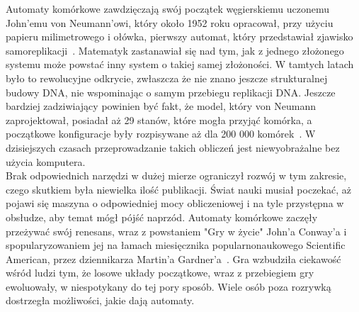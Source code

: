 \documentclass[a4paper,12pt]{article}
\begin{document}
Automaty komórkowe zawdzięczają swój początek węgierskiemu uczonemu John'emu von Neumann'owi, który około 1952 roku opracował, przy użyciu papieru milimetrowego i ołówka, pierwszy automat, który przedstawiał zjawisko samoreplikacji~\cite[s. 155]{hill}. Matematyk zastanawiał się nad tym, jak z jednego złożonego systemu może powstać inny system o takiej samej złożoności. W tamtych latach było to rewolucyjne odkrycie, zwłaszcza że nie znano jeszcze strukturalnej budowy DNA, nie wspominając o samym przebiegu replikacji DNA. Jeszcze bardziej zadziwiający powinien być fakt, że model, który von Neumann zaprojektował, posiadał aż 29 stanów, które mogła przyjąć komórka, a początkowe konfiguracje były rozpisywane aż dla 200 000 komórek~\cite[s. 155, 156]{hill}. W dzisiejszych czasach przeprowadzanie takich obliczeń jest niewyobrażalne bez użycia komputera.\\
Brak odpowiednich narzędzi w dużej mierze ograniczył rozwój w tym zakresie, czego skutkiem była niewielka ilość publikacji. Świat nauki musiał poczekać, aż pojawi się maszyna o odpowiedniej mocy obliczeniowej i na tyle przystępna w obsłudze, aby temat mógł pójść naprzód. Automaty komórkowe zaczęły przeżywać swój renesans, wraz z powstaniem "Gry w życie" John'a Conway'a i spopularyzowaniem jej na łamach miesięcznika popularnonaukowego Scientific American, przez dziennikarza Martin'a Gardner'a~\cite{g}. Gra wzbudziła ciekawość wśród ludzi tym, że losowe układy początkowe, wraz z przebiegiem gry ewoluowały, w niespotykany do tej pory sposób. Wiele osób poza rozrywką dostrzegła możliwości, jakie dają automaty.  
\end{document}

